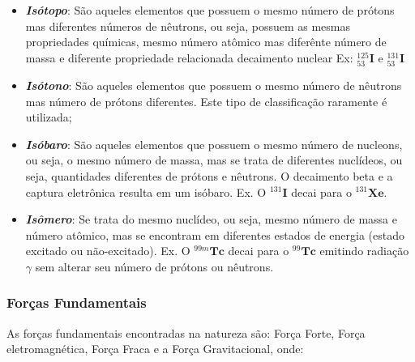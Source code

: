 \documentclass[11pt,a4paper]{article}
\begin{document}
            \begin{itemize}
                \item \textbf{\textit{\textcolor{CarnationPink}{Isótopo}}}: São aqueles elementos que possuem o mesmo número de prótons mas diferentes números de nêutrons, ou seja, possuem as mesmas propriedades químicas, mesmo número atômico mas diferênte número de massa e diferente propriedade relacionada decaimento nuclear Ex:  $ {}_{53}^{125} \mathbf{I} $ e $ {}_{53}^{131} \mathbf{I} $
                \item \textbf{\textit{\textcolor{CarnationPink}{Isótono}}}: São aqueles elementos que possuem o mesmo número de nêutrons mas número de prótons diferentes. Este tipo de classificação raramente é utilizada;
                \item \textbf{\textit{\textcolor{CarnationPink}{Isóbaro}}}: São aqueles elementos que possuem o mesmo número de nucleons, ou seja, o mesmo número de massa, mas se trata de diferentes nuclídeos, ou seja, quantidades diferentes de prótons e nêutrons. O decaimento beta e a captura eletrônica resulta em um isóbaro. Ex. O ${}^{131} \mathbf{I}$ decai para o ${}^{131} \mathbf{Xe}$.
                \item \textbf{\textit{\textcolor{CarnationPink}{Isômero}}}: Se trata do mesmo nuclídeo, ou seja, mesmo número de massa e número atômico, mas se encontram em diferentes estados de energia (estado excitado ou não-excitado). Ex. O ${}^{99m} \mathbf{Tc}$ decai para o ${}^{99} \mathbf{Tc}$ emitindo radiação $\gamma$ sem alterar seu número de prótons ou nêutrons.
            \end{itemize}

        
            \subsubsection{Forças Fundamentais}

                As forças fundamentais encontradas na natureza são: Força Forte, Força eletromagnética, Força Fraca e a Força Gravitacional, onde:
\end{document}
